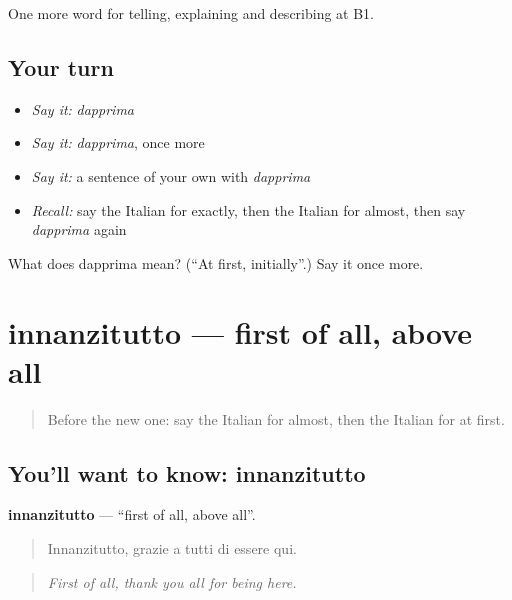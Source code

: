 \begin{grammarlens}[title={What you've built}]
One more word for telling, explaining and describing at B1.
\end{grammarlens}

\subsection*{Your turn}
\begin{itemize}
\raggedright
  \item \emph{Say it:} \emph{dapprima}
  \item \emph{Say it:} \emph{dapprima}, once more
  \item \emph{Say it:} a sentence of your own with \emph{dapprima}
  \item \emph{Recall:} say the Italian for exactly, then the Italian for almost, then say \emph{dapprima} again
\end{itemize}

\begin{tcolorbox}[breakable,colback=teal!4,colframe=teal!35!black,title={Before you move on}]
What does dapprima mean? (\textquotedblleft{}At first, initially\textquotedblright{}.) Say it once more.
\end{tcolorbox}
\section[innanzitutto]{innanzitutto — first of all, above all}

\label{lesson:IT-C273-innanzitutto}



\begin{quote}
Before the new one: say the Italian for almost, then the Italian for at first.
\end{quote}

\subsection*{You'll want to know: innanzitutto}
\textbf{innanzitutto} — \textquotedblleft{}first of all, above all\textquotedblright{}.

\begin{quote}
Innanzitutto, grazie a tutti di essere qui.
\end{quote}

\begin{quote}
\emph{First of all, thank you all for being here.}
\end{quote}

